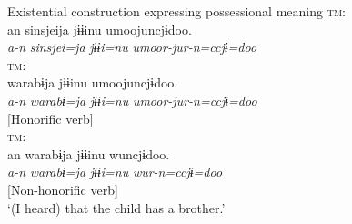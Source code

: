 {\smallex
\ea Existential construction expressing possessional meaning
\ea\label{ex:3.2a} {\textsc{tm}:} \hfill\relax[El: 120924] \\

\gllll   an  {sinsjeija}  {jɨɨinu}  {umoojuncjɨdoo.}\\
                 {\itshape a-n}  {\itshape sinsjei=ja}  {\itshape jɨɨi=nu}  {\itshape umoor-jur-n=ccjɨ=doo}\\
                 [{\textsc{dist}-\textsc{adn}Z}  {teacher]=\textsc{top}}  {brother=\textsc{nom}}  {[exist.\textsc{hon}-\textsc{umrk}-\textsc{ptcp}]=\textsc{qt}=\textsc{ass}}\\
                 {[Subject]} {} {}   {[Honorific verb]}\\
    \glt ‘(I heard) that the teacher has a brother.’\\\relax
         [lit. ‘(I heard) that about the teacher, there is a brother.’]
\ex\label{ex:3.2b} {\textsc{tm}:} \hfill\relax [El: 120924] \\

  {warabɨja}  {jɨɨinu}  {umoojuncjɨdoo.}\\
                   {\itshape a-n}  {\itshape warabɨ=ja}  {\itshape jɨɨi=nu}  {\itshape umoor-jur-n=ccjɨ=doo}\\
                   [{\textsc{dist}-\textsc{adn}Z}  {child]=\textsc{top}}  {brother=\textsc{nom}}  {[exist.\textsc{hon}-\textsc{umrk}-\textsc{ptcp}]=\textsc{qt}=\textsc{ass}}\\
                   [Subject]   {}   {}   {[Honorific verb]}\\
\ex \label{ex:3.2c} {\textsc{tm}:}\hfill\relax[El: 120924] \\

\gllll an  {warabɨja}  {jɨɨinu}  {wuncjɨdoo.}\\
   {\itshape a-n}  {\itshape warabɨ=ja}  {\itshape jɨɨi=nu}  {\itshape wur-n=ccjɨ=doo}\\
   [{\textsc{dist}-\textsc{adn}Z}  {child]=\textsc{top}}  {brother=\textsc{nom}}  {[exist-\textsc{ptcp}]=\textsc{qt}=\textsc{ass}}\\
   [Subject] {} {}     {[Non-honorific verb]}\\
   \glt ‘(I heard) that the child has a brother.’ \\\\
\z
\z} 

